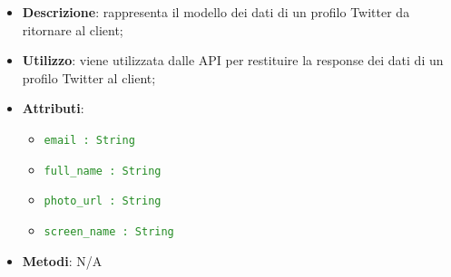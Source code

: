     \begin{itemize}
      \item \textbf{Descrizione}: rappresenta il modello dei dati di un profilo Twitter da ritornare al client;
      \item \textbf{Utilizzo}: viene utilizzata dalle API per restituire la response dei dati di un profilo Twitter al client;

    \item \textbf{Attributi}:
      \begin{itemize}
        \item \textcolor{forestgreen}{\texttt{email : String}}
        \item \textcolor{forestgreen}{\texttt{full\_name : String}}
        \item \textcolor{forestgreen}{\texttt{photo\_url : String}}
        \item \textcolor{forestgreen}{\texttt{screen\_name : String}}
      \end{itemize}
    \item \textbf{Metodi}: N/A
      \end{itemize}


